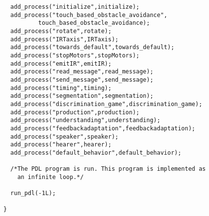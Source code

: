 {\begin{verbatim}
  add_process("initialize",initialize);
  add_process("touch_based_obstacle_avoidance",
	      touch_based_obstacle_avoidance);
  add_process("rotate",rotate);
  add_process("IRTaxis",IRTaxis);
  add_process("towards_default",towards_default);
  add_process("stopMotors",stopMotors);
  add_process("emitIR",emitIR);
  add_process("read_message",read_message);
  add_process("send_message",send_message);
  add_process("timing",timing);
  add_process("segmentation",segmentation);
  add_process("discrimination_game",discrimination_game);
  add_process("production",production);
  add_process("understanding",understanding);
  add_process("feedbackadaptation",feedbackadaptation);
  add_process("speaker",speaker);
  add_process("hearer",hearer);
  add_process("default_behavior",default_behavior);

  /*The PDL program is run. This program is implemented as
    an infinite loop.*/

  run_pdl(-1L);

}
\end{verbatim}}

